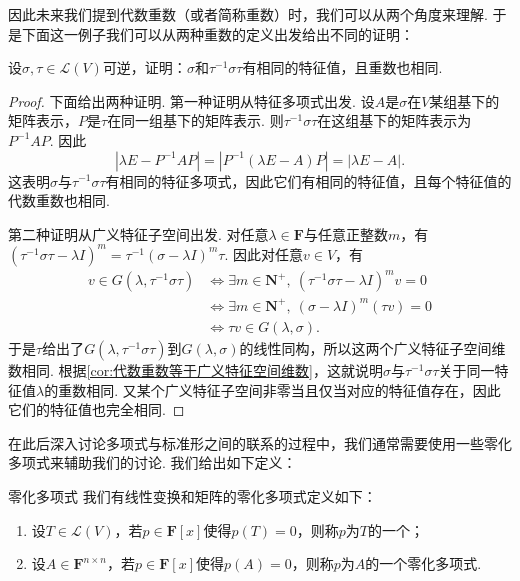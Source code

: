 
因此未来我们提到代数重数（或者简称重数）时，我们可以从两个角度来理解. 于是下面这一例子我们可以从两种重数的定义出发给出不同的证明：
\begin{example}{}{}
    设$\sigma,\tau\in \mathcal{L}(V)$可逆，证明：$\sigma$和$\tau^{-1}\sigma\tau$有相同的特征值，且重数也相同.
\end{example}

\begin{proof}
    下面给出两种证明. 第一种证明从特征多项式出发. 设$A$是$\sigma$在$V$某组基下的矩阵表示，$P$是$\tau$在同一组基下的矩阵表示. 则$\tau^{-1}\sigma\tau$在这组基下的矩阵表示为$P^{-1}AP$. 因此
    \[
        |\lambda E-P^{-1}AP|=|P^{-1}(\lambda E-A)P|=|\lambda E-A|.
    \]
    这表明$\sigma$与$\tau^{-1}\sigma\tau$有相同的特征多项式，因此它们有相同的特征值，且每个特征值的代数重数也相同.

    第二种证明从广义特征子空间出发. 对任意$\lambda\in\mathbf{F}$与任意正整数$m$，有 $(\tau^{-1}\sigma\tau-\lambda I)^m=\tau^{-1}(\sigma-\lambda I)^m\tau$. 因此对任意$v\in V$，有
    \begin{align*}
        v\in G(\lambda,\tau^{-1}\sigma\tau)
         & \iff \exists m\in\mathbf{N}^+,\ (\tau^{-1}\sigma\tau-\lambda I)^mv=0 \\
         & \iff \exists m\in\mathbf{N}^+,\ (\sigma-\lambda I)^m(\tau v)=0       \\
         & \iff \tau v\in G(\lambda,\sigma).
    \end{align*}
    于是$\tau$给出了$G(\lambda,\tau^{-1}\sigma\tau)$到$G(\lambda,\sigma)$的线性同构，所以这两个广义特征子空间维数相同. 根据\autoref{cor:代数重数等于广义特征空间维数}，这就说明$\sigma$与$\tau^{-1}\sigma\tau$关于同一特征值$\lambda$的重数相同. 又某个广义特征子空间非零当且仅当对应的特征值存在，因此它们的特征值也完全相同.
\end{proof}

在此后深入讨论多项式与标准形之间的联系的过程中，我们通常需要使用一些零化多项式来辅助我们的讨论. 我们给出如下定义：
\begin{definition}{零化多项式}{} 
    我们有线性变换和矩阵的零化多项式定义如下：
    \begin{enumerate}
        \item 设$T\in \mathcal{L}(V)$，若$p\in\mathbf{F}[x]$使得$p(T)=0$，则称$p$为$T$的一个；

        \item 设$A\in\mathbf{F}^{n\times n}$，若$p\in\mathbf{F}[x]$使得$p(A)=0$，则称$p$为$A$的一个零化多项式.
    \end{enumerate}
\end{definition}

